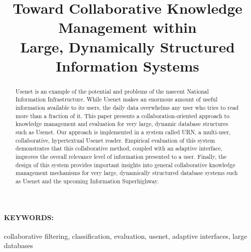 
\title {Toward Collaborative Knowledge Management within\\
Large, Dynamically Structured Information Systems}


\author{}

\maketitle


\begin{abstract}
  
  Usenet is an example of the potential and problems of the nascent
  National Information Infrastructure. While Usenet makes an enormous
  amount of useful information available to its users, the daily data
  overwhelms any user who tries to read more than a fraction of it. This
  paper presents a collaboration-oriented approach to knowledge
  management and evaluation for very large, dynamic database structures
  such as Usenet. Our approach is implemented in a system called URN, a
  multi-user, collaborative, hypertextual Usenet reader.  Empirical
  evaluation of this system demonstrates that this collaborative method,
  coupled with an adaptive interface, improves the overall relevance
  level of information presented to a user.  Finally, the design of this
  system provides important insights into general collaborative knowledge
  management mechanisms for very large, dynamically structured database
  systems such as Usenet and the upcoming Information Superhighway.

\end{abstract}

\paragraph{KEYWORDS:}
collaborative filtering, classification, evaluation, usenet, adaptive
interfaces, large databases





